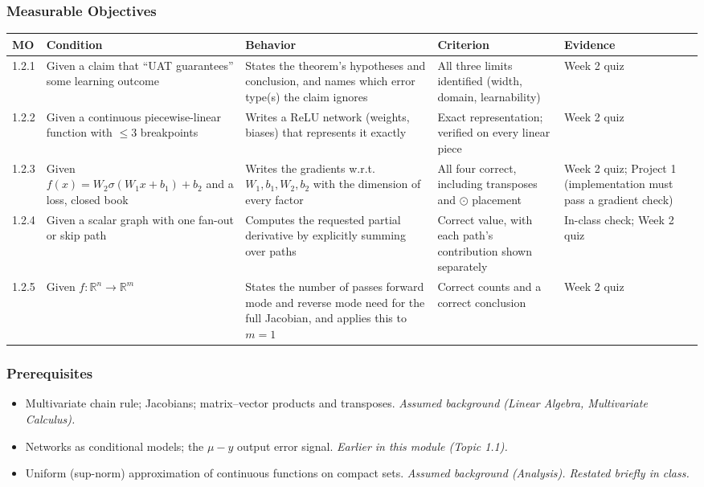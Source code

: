 \documentclass[11pt]{article}
\newcommand{\R}{\mathbb{R}}
\begin{document}
\subsubsection*{Measurable Objectives}
\begin{longtable}{@{}p{1.1cm}p{3.4cm}p{4.3cm}p{3.0cm}p{2.7cm}@{}}
\toprule
\textbf{MO} & \textbf{Condition} & \textbf{Behavior} & \textbf{Criterion} & \textbf{Evidence} \\
\midrule
\endhead
1.2.1 & Given a claim that ``UAT guarantees'' some learning outcome & States the theorem's hypotheses and conclusion, and names which error type(s) the claim ignores & All three limits identified (width, domain, learnability) & Week 2 quiz \\
1.2.2 & Given a continuous piecewise-linear function with $\le 3$ breakpoints & Writes a ReLU network (weights, biases) that represents it exactly & Exact representation; verified on every linear piece & Week 2 quiz \\
1.2.3 & Given $f(x)=W_2\sigma(W_1x+b_1)+b_2$ and a loss, closed book & Writes the gradients w.r.t.\ $W_1, b_1, W_2, b_2$ with the dimension of every factor & All four correct, including transposes and $\odot$ placement & Week 2 quiz; Project 1 (implementation must pass a gradient check) \\
1.2.4 & Given a scalar graph with one fan-out or skip path & Computes the requested partial derivative by explicitly summing over paths & Correct value, with each path's contribution shown separately & In-class check; Week 2 quiz \\
1.2.5 & Given $f:\R^n\to\R^m$ & States the number of passes forward mode and reverse mode need for the full Jacobian, and applies this to $m = 1$ & Correct counts and a correct conclusion & Week 2 quiz \\
\bottomrule
\end{longtable}

\subsubsection*{Prerequisites}
\begin{itemize}
  \item Multivariate chain rule; Jacobians; matrix--vector products and transposes. \emph{Assumed background (Linear Algebra, Multivariate Calculus).}
  \item Networks as conditional models; the $\mu - y$ output error signal. \emph{Earlier in this module (Topic 1.1).}
  \item Uniform (sup-norm) approximation of continuous functions on compact sets. \emph{Assumed background (Analysis). Restated briefly in class.}
\end{itemize}
\end{document}
